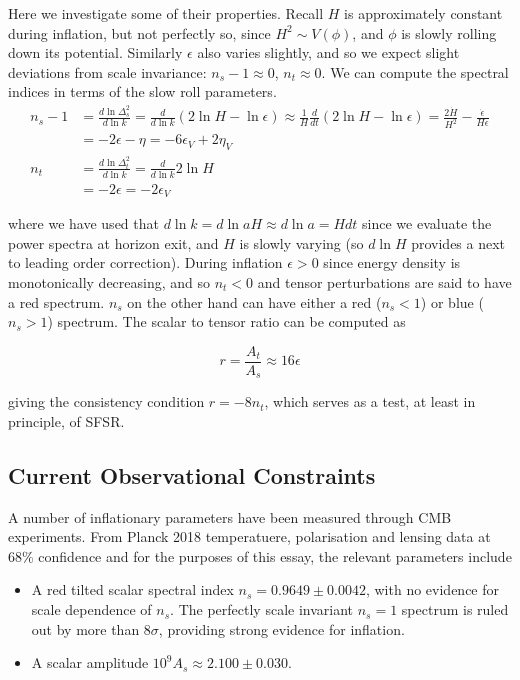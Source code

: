 \documentclass[a4paper,10pt]{article}
\begin{document}
Here we investigate some of their properties. Recall $H$ is approximately constant during inflation, but not perfectly so, since $H^2 \sim V(\phi)$, and $\phi$ is slowly rolling down its potential. Similarly $\epsilon$ also varies slightly, and so we expect slight deviations from scale invariance:  $n_s-1\approx0$, $n_t\approx0$. We can compute the spectral indices in terms of the slow roll parameters. 
\begin{equation}\begin{split}
n_s-1 &= \frac{d\ln{\Delta^2_s}}{d\ln{k}} = \frac{d}{d\ln{k}}(2\ln{H}-\ln{\epsilon}) \approx \frac{1}{H}\frac{d}{dt}(2\ln{H}-\ln{\epsilon}) = \frac{2\dot{H}}{H^2}-\frac{\dot{\epsilon}}{H\epsilon}\\
& = -2\epsilon-\eta = -6\epsilon_V+2\eta_V\\
n_t &= \frac{d\ln{\Delta^2_t}}{d\ln{k}} = \frac{d}{d\ln{k}}2\ln{H}\\
&=-2\epsilon=-2\epsilon_V
\label{spectral}
\end{split}\end{equation}

where we have used that $d\ln{k} = d\ln{aH} \approx d\ln{a} = Hdt$ since we evaluate the power spectra at horizon exit, and $H$ is slowly varying (so $d\ln{H}$ provides a next to leading order correction). During inflation $\epsilon>0$ since energy density is monotonically decreasing, and so $n_t<0$ and tensor perturbations are said to have a red spectrum. $n_s$ on the other hand can have either a red ($n_s<1$) or blue ($n_s>1$) spectrum. The scalar to tensor ratio can be computed as

\begin{equation}
r=\frac{A_t}{A_s} \approx 16\epsilon
\end{equation}

giving the consistency condition $r=-8n_t$, which serves as a test, at least in principle, of SFSR.


\subsection{Current Observational Constraints}


A number of inflationary parameters have been measured through CMB experiments. From Planck 2018 temperatuere, polarisation and lensing data at 68\% confidence and for the purposes of this essay, the relevant parameters include \cite{Planck}
 
\begin{itemize}
\item A red tilted scalar spectral index $n_s =0.9649 \pm 0.0042$, with no evidence for scale dependence of $n_s$. The perfectly scale invariant $n_s=1$ spectrum is ruled out by more than $8\sigma$, providing strong evidence for inflation.
\item A scalar amplitude  $10^9 A_s \approx 2.100 \pm 0.030$.
\end{itemize}
\end{document}
